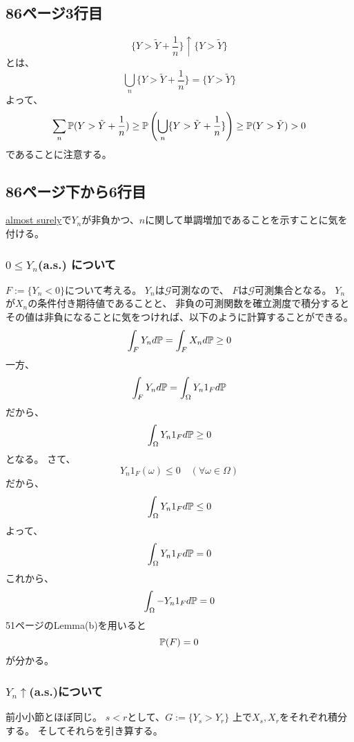     \subsection{86ページ3行目}
      \[
        \{ Y > \tilde{Y} + \frac{1}{n} \} \uparrow
        \{ Y > \tilde{Y}\}
      \]
      とは、
      \[
        \bigcup_{n}\{ Y > \tilde{Y} + \frac{1}{n} \} =
        \{ Y > \tilde{Y}\}
      \]
      よって、
      \[
        \sum_n {\mathbb{P}}(Y > \tilde{Y} + \frac{1}{n})
        \ge
        {\mathbb{P}} \left(\bigcup_{n}\{ Y > \tilde{Y} + \frac{1}{n} \} \right)
        \ge
        {\mathbb{P}}(Y > \tilde{Y})
        > 0
      \]
      であることに注意する。

      \subsection{86ページ下から6行目}
        \underline{almost surely}で$Y_n$が非負かつ、$n$に関して単調増加であることを示すことに気を付ける。
      \subsubsection{$0 \leq Y_n$(a.s.) について}
        $F := \{ Y_n < 0 \}$について考える。
        $Y_n$は$\mathcal{G}$可測なので、
        $F$は$\mathcal{G}$可測集合となる。
        $Y_n$が$X_n$の条件付き期待値であることと、
        非負の可測関数を確立測度で積分するとその値は非負になることに気をつければ、以下のように計算することができる。
        \begin{equation*}
          \int_F Y_n d{\mathbb{P}} = \int_F X_n d{\mathbb{P}} \ge 0
        \end{equation*}
        一方、
        \[
          \int_F Y_n d{\mathbb{P}} = \int_{\Omega} Y_n 1_F d{\mathbb{P}}
        \]
        だから、
        \[
          \int_{\Omega} Y_n 1_F d{\mathbb{P}} \ge 0
        \]
        となる。
        さて、
        \[
          Y_n 1_F(\omega) \leq 0 \quad (\forall \omega \in \Omega)
        \]
        だから、
        \[
          \int_{\Omega} Y_n 1_F d{\mathbb{P}} \leq 0
        \]
        よって、
        \[
          \int_{\Omega} Y_n 1_F d{\mathbb{P}} = 0
        \]
        これから、
        \[
          \int_{\Omega} -Y_n 1_F d{\mathbb{P}} = 0
        \]
        51ページのLemma(b)を用いると
        \[
          {\mathbb{P}}(F) = 0
        \]
        が分かる。

      \subsubsection{$Y_n \uparrow$(a.s.)について}
        前小小節とほぼ同じ。
        $s < r$として、$G := \{ Y_s > Y_r \}$
        上で$X_s,X_r$をそれぞれ積分する。
        そしてそれらを引き算する。

